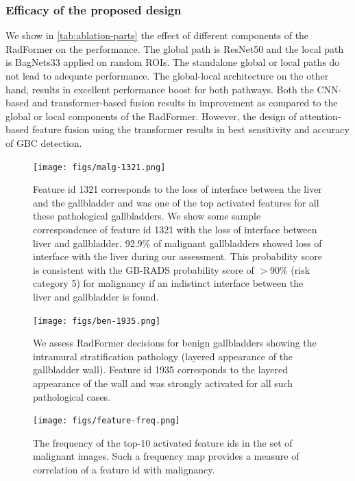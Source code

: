 \documentclass[twocolumn,final]{elsarticle}
\def\myarch{RadFormer\xspace}
\begin{document}
\subsubsection{Efficacy of the proposed design}
%
We show in \cref{tab:ablation-parts} the effect of different components of the \myarch on the performance. The global path is ResNet50 and the local path is BagNets33 applied on random ROIs. The standalone global or local paths do not lead to adequate performance. The global-local architecture on the other hand, results in excellent performance boost for both pathways. Both the CNN-based and transformer-based fusion results in improvement as compared to the global or local components of the \myarch. However, the design of attention-based feature fusion using the transformer results in best sensitivity and accuracy of GBC detection.
%
\begin{figure}[t]
	\centering
	\texttt{[image: figs/malg-1321.png]}
	\caption{Feature id 1321 corresponds to the loss of interface between the liver and the gallbladder and was one of the top activated features for all these pathological gallbladders. We show some sample correspondence of feature id 1321 with the loss of interface between liver and gallbladder. 92.9\% of malignant gallbladders showed loss of interface with the liver during our assessment. This probability score is consistent with the GB-RADS probability score of $>\!90$\% (risk category 5) for malignancy if an indistinct interface between the liver and gallbladder is found.}
	\label{fig:malg_corr_1}
\end{figure}

\begin{figure}[t]
    \centering
    \texttt{[image: figs/ben-1935.png]}
    \caption{We assess \myarch decisions for benign gallbladders showing the intramural stratification pathology (layered appearance of the gallbladder wall). Feature id 1935 corresponds to the layered appearance of the wall and was strongly activated for all such pathological cases.}
    \label{fig:ben_corr_1}
\end{figure}
%
\begin{figure}[t]
    \centering
    \texttt{[image: figs/feature-freq.png]}
    \caption{The frequency of the top-10 activated feature ids in the set of malignant images. Such a frequency map provides a measure of correlation of a feature id with malignancy.}
    \label{fig:correlation_freq}
\end{figure}
%
\end{document}
